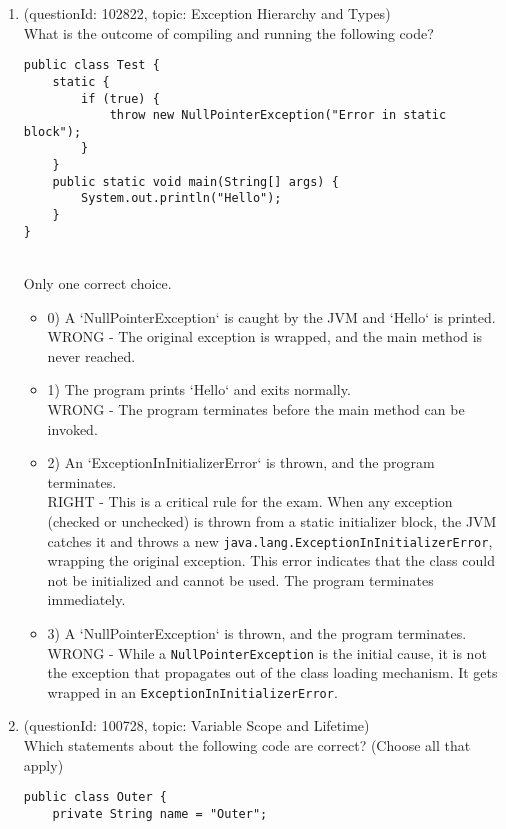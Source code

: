 \documentclass[12pt]{article}
\begin{document}
\begin{enumerate}[label=(\arabic*)]
\begin{itemize}
\end{itemize}
\item (questionId: 102822, topic: Exception Hierarchy and Types) \\ 
What is the outcome of compiling and running the following code?
\begin{verbatim}
public class Test {
    static {
        if (true) {
            throw new NullPointerException("Error in static block");
        }
    }
    public static void main(String[] args) {
        System.out.println("Hello");
    }
}
\end{verbatim}
\\ \noindent Only one correct choice. 
\begin{itemize}
\item 0) A `NullPointerException` is caught by the JVM and `Hello` is printed.
 \\ 
WRONG - The original exception is wrapped, and the main method is never reached.

\item 1) The program prints `Hello` and exits normally.
 \\ 
WRONG - The program terminates before the main method can be invoked.

\item 2) An `ExceptionInInitializerError` is thrown, and the program terminates.
 \\ 
RIGHT - This is a critical rule for the exam. When any exception (checked or unchecked) is thrown from a static initializer block, the JVM catches it and throws a new \verb|java.lang.ExceptionInInitializerError|, wrapping the original exception. This error indicates that the class could not be initialized and cannot be used. The program terminates immediately.

\item 3) A `NullPointerException` is thrown, and the program terminates.
 \\ 
WRONG - While a \verb|NullPointerException| is the initial cause, it is not the exception that propagates out of the class loading mechanism. It gets wrapped in an \verb|ExceptionInInitializerError|.

\end{itemize}
\item (questionId: 100728, topic: Variable Scope and Lifetime) \\ 
Which statements about the following code are correct? (Choose all that apply)\n\begin{verbatim}
public class Outer {
    private String name = "Outer";


\end{verbatim}
\end{enumerate}
\end{document}
